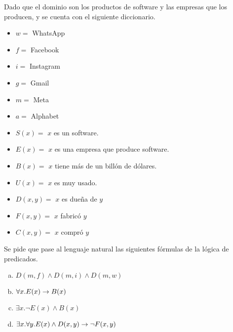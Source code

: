 \begin{exercise}
    Dado que el dominio son los productos de software y las empresas que los producen, y se cuenta con el siguiente diccionario.

    \begin{itemize}[label=, leftmargin=0mm,itemsep=8pt]
        \item $w = $ WhatsApp
        \item $f = $ Facebook
        \item $i = $ Instagram
        \item $g = $ Gmail
        \item $m = $ Meta
        \item $a = $ Alphabet
        \item $S(x) = $ $x$ es un software.
        \item $E(x) = $ $x$ es una empresa que produce software.
        \item $B(x) = $ $x$ tiene más de un billón de dólares.
        \item $U(x) = $ $x$ es muy usado.
        \item $D(x, y) = $ $x$ es dueña de  $y$
        \item $F(x, y) = $ $x$ fabricó $y$
        \item $C(x, y) = $ $x$ compró $y$
    \end{itemize}

    Se pide que pase al lenguaje natural las siguientes fórmulas de la lógica de predicados.

    \begin{enumerate}[a)]
        \item $D(m, f) \land D(m, i) \land D(m, w)$
        \item $\forall x. E(x) \to B(x)$
        \item $\exists x. \lnot E(x) \land B(x)$
        \item $\exists x. \forall y. E(x) \land D(x, y) \to \lnot F(x, y)$
    \end{enumerate}
\end{exercise}

